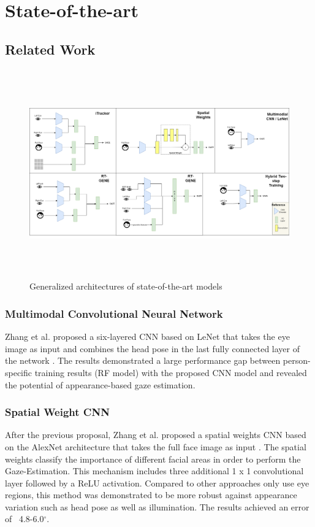 
\chapter{State-of-the-art}
\label{Chap2}


\section{Related Work}

\begin{figure}
    \centering
    \includegraphics[width=\textwidth,height=9cm]{img/figures/gaze-architectures.png}
    \caption{Generalized architectures of state-of-the-art models}
    \label{architectures_comparison}
 \end{figure}

\subsection{Multimodal Convolutional Neural Network}
Zhang et al. proposed a six-layered CNN based on LeNet that takes the eye image as input and combines the head pose in the last fully connected layer of the network \cite{GazeEstimationInTheWild}. The results demonstrated a large performance gap between person-specific training results (RF model) with the proposed CNN model and revealed the potential of appearance-based gaze estimation.

\subsection{Spatial Weight CNN}
After the previous proposal, Zhang et al. proposed a spatial weights CNN based on the AlexNet architecture \cite{alex_net} that takes the full face image as input \cite{written_all_over_your_face}. The spatial weights classify the importance of different facial areas in order to perform the Gaze-Estimation. This mechanism includes three additional 1 x 1 convolutional layer followed by a ReLU activation. Compared to other approaches only use eye regions, this method was demonstrated to be more robust against appearance variation such as head pose as well as illumination. The results achieved an error of ~4.8-6.0$^{\circ}$.

